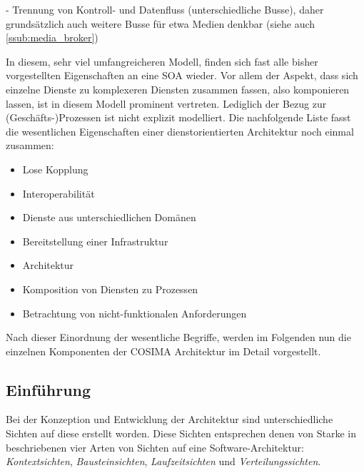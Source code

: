   - Trennung von Kontroll- und Datenfluss (unterschiedliche Busse), daher grundsätzlich auch weitere Busse für etwa Medien denkbar (siehe auch \ref{ssub:media_broker})

  In diesem, sehr viel umfangreicheren Modell, finden sich fast alle bisher vorgestellten Eigenschaften an eine SOA wieder. Vor allem der Aspekt, dass sich einzelne Dienste zu komplexeren Diensten zusammen fassen, also komponieren lassen, ist in diesem Modell prominent vertreten. Lediglich der Bezug zur (Geschäfts-)Prozessen ist nicht explizit modelliert. Die nachfolgende Liste fasst die wesentlichen Eigenschaften einer dienstorientierten Architektur noch einmal zusammen:

  \begin{itemize}
    \item Lose Kopplung
    \item Interoperabilität
    \item Dienste aus unterschiedlichen Domänen
    \item Bereitstellung einer Infrastruktur
    \item Architektur
    \item Komposition von Diensten zu Prozessen
    \item Betrachtung von nicht-funktionalen Anforderungen
  \end{itemize}


  Nach dieser Einordnung der wesentliche Begriffe, werden im Folgenden nun die einzelnen Komponenten der COSIMA Architektur im Detail vorgestellt.


\subsection{Einführung} %
\label{sub:einfuehrung}

  Bei der Konzeption und Entwicklung der Architektur sind unterschiedliche Sichten auf diese erstellt worden. Diese Sichten entsprechen denen von Starke in~\citep[S. 83]{effektive_software_architekturen} beschriebenen vier Arten von Sichten auf eine Software-Architektur: \emph{Kontextsichten}, \emph{Bausteinsichten}, \emph{Laufzeitsichten} und \emph{Verteilungssichten}.

